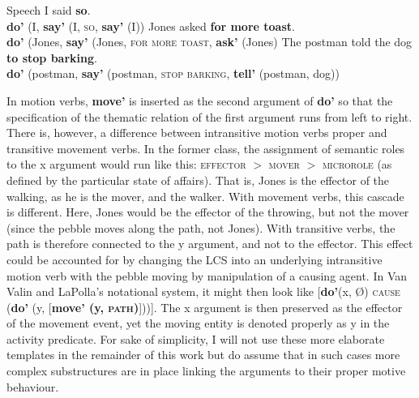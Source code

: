 \ea Speech \label{ex_english2}
\ea I said \textbf{so}. \\
\textbf{do'} (I, \textbf{say'} (I, \textsc{so}, \textbf{say'} (I))
\ex Jones asked \textbf{for more toast}. \\
\textbf{do'} (Jones, \textbf{say'} (Jones, \textsc{for more toast},  \textbf{ask'} (Jones)
\ex The postman told the dog \textbf{to stop barking}. \\
\textbf{do'} (postman, \textbf{say'} (postman, \textsc{stop barking}, \textbf{tell'} (postman, dog))
\z
\z


In motion verbs, \textbf{move'} is inserted as the second argument of \textbf{do'} so that the specification of the thematic relation of the first argument runs from left to right. There is, however, a difference between intransitive motion verbs proper and transitive movement verbs. In the former class, the assignment of semantic roles to the x argument would run like this: \textsc{effector} $>$ \textsc{mover} $>$ \textsc{microrole} (as defined by the particular state of affairs). That is, Jones is the effector of the walking, as he is the mover, and the walker. With movement verbs, this cascade is different. Here, Jones would be the effector of the throwing, but not the mover (since the pebble moves along the path, not Jones). With transitive verbs, the path is therefore connected to the y argument, and not to the effector. This effect could be accounted for by changing the LCS into an underlying intransitive motion verb with the pebble moving by manipulation of a causing agent. In Van Valin and LaPolla's notational system, it might then look like [\textbf{do'}(x, Ø) \textsc{cause} (\textbf{do'} (y, [\textbf{move' (y, \textsc{path})}]))]. The x argument is then preserved as the effector of the movement event, yet the moving entity is denoted properly as y in the activity predicate. For sake of simplicity, I will not use these more elaborate templates in the remainder of this work but do assume that in such cases more complex substructures are in place linking the arguments to their proper motive behaviour.


